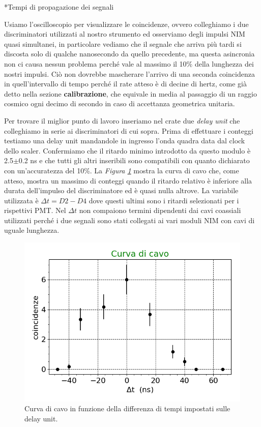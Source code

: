 \documentclass[12pt, a4paper]{article}
\begin{document}
\begin{section}*{Tempi di propagazione dei segnali}

Usiamo l'oscilloscopio per visualizzare le coincidenze, ovvero colleghiamo i due discriminatori utilizzati al nostro strumento ed osserviamo degli impulsi NIM quasi simultanei, in particolare vediamo che il segnale che arriva più tardi si discosta solo di qualche nanosecondo da quello precedente, ma questa asincronia non ci causa nessun problema perché vale al massimo il 10\% della lunghezza dei nostri impulsi.
Ciò non dovrebbe mascherare l'arrivo di una seconda coincidenza in quell'intervallo di tempo perché il rate atteso è di decine di hertz, come già detto nella sezione \textbf{calibrazione}, che equivale in media al passaggio di un raggio cosmico ogni decimo di secondo in caso di accettanza geometrica unitaria.

Per trovare il miglior punto di lavoro inseriamo nel crate due \emph{delay unit} che colleghiamo in serie ai discriminatori di cui sopra. Prima di effettuare i conteggi testiamo una delay unit mandandole in ingresso l'onda quadra data dal clock dello scaler. Confermiamo che il ritardo minimo introdotto da questo modulo è 2.5$\pm$0.2\! ns e che tutti gli altri inseribili sono compatibili con quanto dichiarato con un'accuratezza del 10\%. La \emph{Figura \ref{curv}} mostra la curva di cavo che, come atteso, mostra un massimo di conteggi quando il ritardo relativo è inferiore alla durata dell'impulso del discriminatore ed è quasi nulla altrove. La variabile utilizzata è $\Delta t=D2-D4$ dove questi ultimi sono i ritardi selezionati per i rispettivi PMT. Nel $\Delta t$ non compaiono termini dipendenti dai cavi coassiali utilizzati perché i due segnali sono stati collegati ai vari moduli NIM con cavi di uguale lunghezza.

\begin{figure}[h]
\centering
\includegraphics[width=8 cm]{curva_cavo}
\caption{Curva di cavo in funzione della differenza di tempi impostati sulle delay unit.}
\label{curv}
\end{figure}

\end{section}
\end{document}

